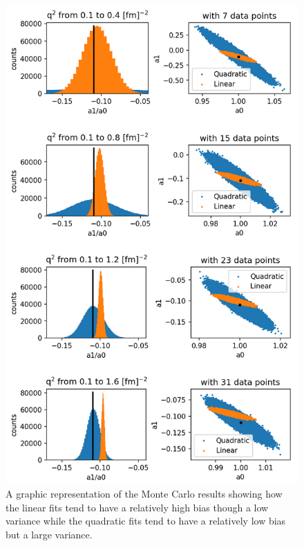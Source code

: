 \documentclass[10pt,aps,prc,twocolumn]{revtex4-1}
\begin{document}
\begin{figure}[htbp]
\includegraphics[width=\columnwidth]{Figure/zresult.png}
\caption{A graphic representation of the Monte Carlo results showing how the linear fits tend to have a relatively
high bias though a low variance while the quadratic fits tend to have a relatively low bias but a large variance.}
\end{figure}
\end{document}
